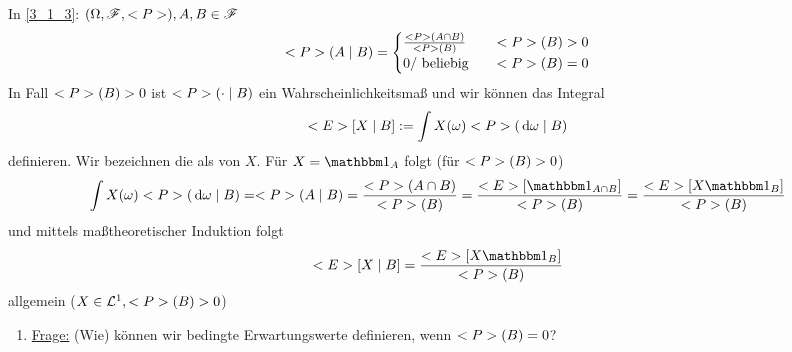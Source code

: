 ﻿In \cref{3_1_3}: $(\O, \F, \P), A,B \in \F$ %
\begin{align*}
	\P(A \mid B) = \begin{cases}
	\frac{\P(A \cap B)}{\P(B)} &\quad \P(B) > 0\\
	0/ \text{ beliebig} &\quad \P(B) = 0
	\end{cases}
\end{align*}
In Fall $\P(B) > 0$ ist $\P(\cdot\mid B)$ ein Wahrscheinlichkeitsmaß und wir können das Integral 
\[
	\E[X \mid B] := \int X(\omega) \P(\d \omega \mid B)
\]
definieren. Wir bezeichnen die als  von $X$. Für $X= \indi_{A}$ folgt (für $\P(B) > 0$)
\[
	\int X(\omega) \P(\d \omega \mid B) = \P (A \mid B) = \frac{\P(A \cap B)}{\P(B)} = \frac{\E[\indi_{A\cap B}]}{\P(B)} = \frac{\E[X \indi_{B}]}{\P(B)}
\]
und mittels maßtheoretischer Induktion folgt
\begin{align*}
	\E[X \mid B] = \frac{\E[X \indi_B]}{\P(B)}
\end{align*}
allgemein ($X \in \Ln{1}, \P(B) > 0$)
\begin{enumerate}[label=]
	\item \ul{Frage:} (Wie) können wir bedingte Erwartungswerte definieren, wenn $\P(B) = 0$?
\end{enumerate}
